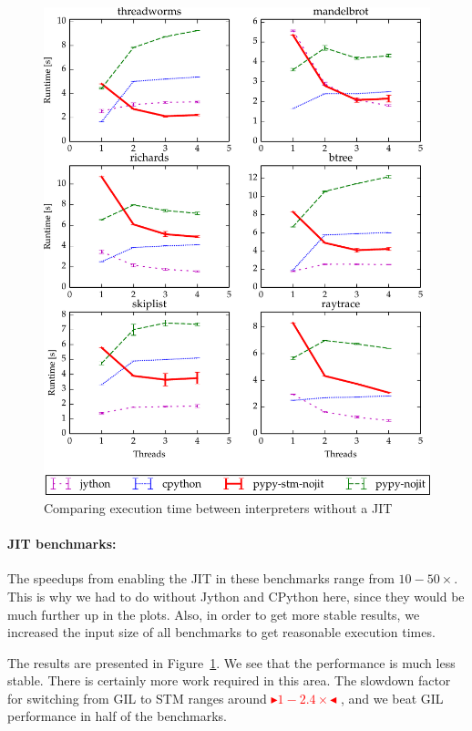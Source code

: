 \documentclass{sigplanconf}
\newcommand{\mynote}[2]{%
  \textcolor{red}{%
    \fbox{\bfseries\sffamily\scriptsize#1}%
    {\small$\blacktriangleright$\textsf{\emph{#2}}$\blacktriangleleft$}%
  }%
}
\newcommand\remi[1]{\mynote{Remi}{#1}}
\begin{document}
\begin{figure}[h]
  \centering
  \includegraphics[width=1\columnwidth]{plots/performance_nojit.pdf}
  \caption{Comparing execution time between interpreters without a JIT\label{fig:performance-nojit}}
\end{figure}


\paragraph{JIT benchmarks:} The speedups from enabling the JIT in
these benchmarks range from $10-50\times$. This is why we had to do
without Jython and CPython here, since they would be much further up
in the plots. Also, in order to get more stable results, we increased
the input size of all benchmarks to get reasonable execution times.

The results are presented in Figure~\ref{fig:performance-nojit}. We
see that the performance is much less stable. There is certainly more
work required in this area. The slowdown factor for switching from GIL
to STM ranges around \remi{$1-2.4\times$}, and we beat GIL performance
in half of the benchmarks.
\end{document}
